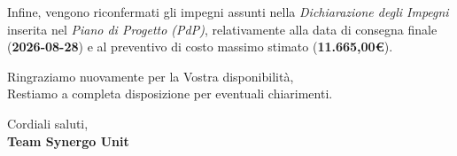 \documentclass[11pt, a4paper]{article}
\begin{document}
    \vspace{0.3cm}
    Infine, vengono riconfermati gli impegni assunti nella \textit{Dichiarazione degli Impegni} inserita nel \textit{Piano di Progetto (PdP)}, relativamente alla data di consegna finale (\textbf{2026-08-28}) e al preventivo di costo massimo stimato (\textbf{11.665,00\euro}).

    \vspace{0.5cm}
    Ringraziamo nuovamente per la Vostra disponibilità,\\
    Restiamo a completa disposizione per eventuali chiarimenti.
    
    \vspace{0.5cm}
    Cordiali saluti,\\
    \textbf{Team Synergo Unit} 
\end{document}

